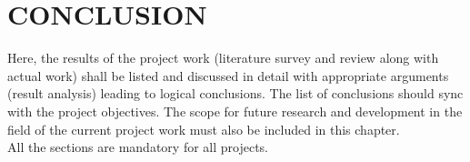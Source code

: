 \chapter{CONCLUSION} %
\label{ChapterResults} %

Here, the results of the project work (literature survey and review along with actual work) shall be listed and discussed in detail with appropriate arguments (result analysis) leading to logical conclusions. The list of conclusions should sync with the project objectives. The scope for future research and development in the field of the current project work must also be included in this chapter.  \\

All the sections are mandatory for all projects. 
